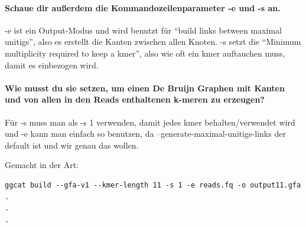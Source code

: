 \documentclass[11pt,a4paper]{article}
\begin{document}
    \paragraph{Schaue dir außerdem die Kommandozeilenparameter -e und -s an.}
    -e ist ein Output-Modus und wird benutzt für ``build links between maximal unitigs'', also es erstellt die Kanten zwischen allen Knoten. -s setzt die ``Minimum multiplicity required to keep a kmer'', also wie oft ein kmer auftauchen muss, damit es einbezogen wird.  \cite{ggcat}

    \paragraph{Wie musst du sie setzen, um einen De Bruijn Graphen mit Kanten und von allen in den Reads enthaltenen k-meren zu erzeugen?}
    Für -s muss man als -s 1 verwenden, damit jedes kmer behalten/verwendet wird und -e kann man einfach so benutzen, da --generate-maximal-unitigs-links der default ist und wir genau das wollen.

    \noindent Gemacht in der Art:
    \begin{verbatim}
ggcat build --gfa-v1 --kmer-length 11 -s 1 -e reads.fq -o output11.gfa
.
.
.
    \end{verbatim}
\end{document}
